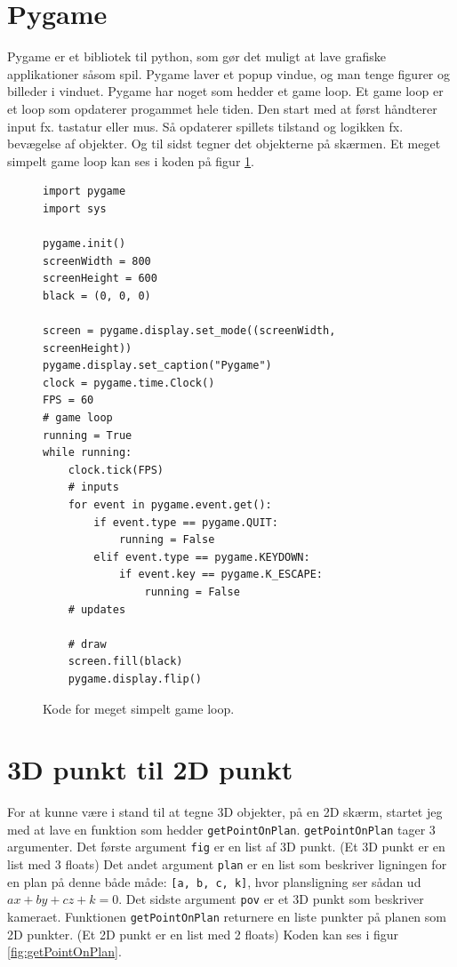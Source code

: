 \documentclass{article}
\begin{document}
\section{Pygame}
Pygame er et bibliotek til python, som gør det muligt at lave grafiske applikationer såsom spil.
Pygame laver et popup vindue, og man tenge figurer og billeder i vinduet.
Pygame har noget som hedder et game loop. Et game loop er et loop som opdaterer progammet hele tiden.
Den start med at først håndterer input fx. tastatur eller mus.
Så opdaterer spillets tilstand og logikken fx. bevægelse af objekter.
Og til sidst tegner det objekterne på skærmen.
Et meget simpelt game loop kan ses i koden på figur \ref{fig:pgkode}.

\begin{figure}[H]
\begin{verbatim}
import pygame
import sys

pygame.init()
screenWidth = 800
screenHeight = 600
black = (0, 0, 0)

screen = pygame.display.set_mode((screenWidth, screenHeight))
pygame.display.set_caption("Pygame")
clock = pygame.time.Clock()
FPS = 60
# game loop
running = True
while running:
    clock.tick(FPS)
    # inputs
    for event in pygame.event.get():
        if event.type == pygame.QUIT:
            running = False
        elif event.type == pygame.KEYDOWN:
            if event.key == pygame.K_ESCAPE:
                running = False
    # updates

    # draw
    screen.fill(black)
    pygame.display.flip()
\end{verbatim}
\caption{\label{fig:pgkode}Kode for meget simpelt game loop.}
\end{figure}

\section{3D punkt til 2D punkt}
For at kunne være i stand til at tegne 3D objekter, på en 2D skærm, 
startet jeg med at lave en funktion som hedder \texttt{getPointOnPlan}.
\texttt{getPointOnPlan} tager 3 argumenter.
Det første argument \texttt{fig} er en list af 3D punkt. (Et 3D punkt er en list med 3 floats)
Det andet argument \texttt{plan} er en list som beskriver ligningen for en plan på denne både måde: 
\texttt{[a, b, c, k]}, hvor plansligning ser sådan ud $ax+by+cz+k=0$.
Det sidste argument \texttt{pov} er et 3D punkt som beskriver kameraet.
Funktionen \texttt{getPointOnPlan} returnere en liste punkter på planen som 2D punkter. (Et 2D punkt er en list med 2 floats)
Koden kan ses i figur \ref{fig:getPointOnPlan}.
\end{document}
